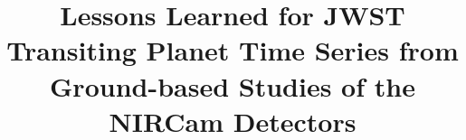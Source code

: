 \documentclass{aastex62}
\begin{document}
\title{Lessons Learned for JWST Transiting Planet Time Series from Ground-based Studies of the NIRCam Detectors}


\end{document}
